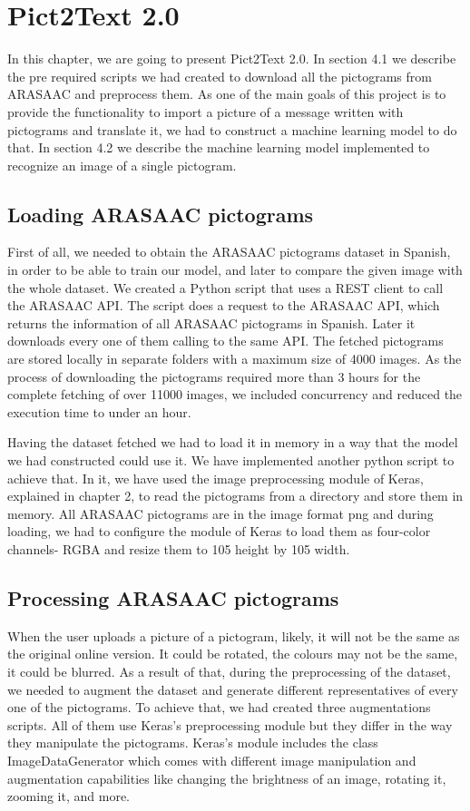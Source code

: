 \chapter{Pict2Text 2.0}
\label{Pict2Text 2.0}

In this chapter, we are going to present Pict2Text 2.0. In section 4.1 we describe the pre required scripts we had created to download all the pictograms from ARASAAC and preprocess them. As one of the main goals of this project is to provide the functionality to import a picture of a message written with pictograms and translate it, we had to construct a machine learning model to do that. In section 4.2 we describe the machine learning model implemented to recognize an image of a single pictogram. 

\section{Loading ARASAAC pictograms}
First of all, we needed to obtain the ARASAAC pictograms dataset in Spanish, in order to be able to train our model, and later to compare the given image with the whole dataset. We created a Python script that uses a REST client to call the ARASAAC API. The script does a request to the ARASAAC API, which returns the information of all ARASAAC pictograms in Spanish. Later it downloads every one of them calling to the same API. The fetched pictograms are stored locally in separate folders with a maximum size of 4000 images. As the process of downloading the pictograms required more than 3 hours for the complete fetching of over 11000 images, we included concurrency and reduced the execution time to under an hour. 

Having the dataset fetched we had to load it in memory in a way that the model we had constructed could use it. We have implemented another python script to achieve that. In it, we have used the image preprocessing module of Keras, explained in chapter 2, to read the pictograms from a directory and store them in memory. All ARASAAC pictograms are in the image format png and during loading, we had to configure the module of Keras to load them as four-color channels- RGBA and resize them to 105 height by 105 width.

\section{Processing ARASAAC pictograms}
When the user uploads a picture of a pictogram, likely, it will not be the same as the original online version. It could be rotated, the colours may not be the same, it could be blurred. As a result of that, during the preprocessing of the dataset, we needed to augment the dataset and generate different representatives of every one of the pictograms. To achieve that, we had created three augmentations scripts. All of them use Keras's preprocessing module but they differ in the way they manipulate the pictograms. Keras's module includes the class ImageDataGenerator which comes with different image manipulation and augmentation capabilities like changing the brightness of an image, rotating it, zooming it, and more.
